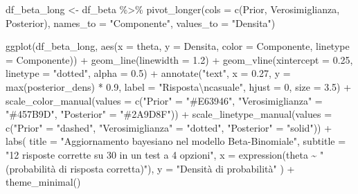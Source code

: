 \documentclass[
  letterpaper,
  DIV=11,
  numbers=noendperiod,
  oneside]{scrreprt}
\newenvironment{Shaded}{\begin{snugshade}}{\end{snugshade}}
\newcommand{\AttributeTok}[1]{\textcolor[rgb]{0.40,0.45,0.13}{#1}}
\newcommand{\DecValTok}[1]{\textcolor[rgb]{0.68,0.00,0.00}{#1}}
\newcommand{\FloatTok}[1]{\textcolor[rgb]{0.68,0.00,0.00}{#1}}
\newcommand{\FunctionTok}[1]{\textcolor[rgb]{0.28,0.35,0.67}{#1}}
\newcommand{\NormalTok}[1]{\textcolor[rgb]{0.00,0.23,0.31}{#1}}
\newcommand{\OtherTok}[1]{\textcolor[rgb]{0.00,0.23,0.31}{#1}}
\newcommand{\SpecialCharTok}[1]{\textcolor[rgb]{0.37,0.37,0.37}{#1}}
\newcommand{\StringTok}[1]{\textcolor[rgb]{0.13,0.47,0.30}{#1}}
\theoremstyle{definition}
\theoremstyle{plain}
\theoremstyle{definition}
\theoremstyle{remark}
\begin{document}
\begin{Shaded}
\begin{Highlighting}[]
\NormalTok{df\_beta\_long }\OtherTok{\textless{}{-}}\NormalTok{ df\_beta }\SpecialCharTok{\%\textgreater{}\%}
  \FunctionTok{pivot\_longer}\NormalTok{(}\AttributeTok{cols =} \FunctionTok{c}\NormalTok{(Prior, Verosimiglianza, Posterior),}
               \AttributeTok{names\_to =} \StringTok{"Componente"}\NormalTok{, }\AttributeTok{values\_to =} \StringTok{"Densita"}\NormalTok{)}

\FunctionTok{ggplot}\NormalTok{(df\_beta\_long, }\FunctionTok{aes}\NormalTok{(}\AttributeTok{x =}\NormalTok{ theta, }\AttributeTok{y =}\NormalTok{ Densita, }\AttributeTok{color =}\NormalTok{ Componente, }\AttributeTok{linetype =}\NormalTok{ Componente)) }\SpecialCharTok{+}
  \FunctionTok{geom\_line}\NormalTok{(}\AttributeTok{linewidth =} \FloatTok{1.2}\NormalTok{) }\SpecialCharTok{+}
  \FunctionTok{geom\_vline}\NormalTok{(}\AttributeTok{xintercept =} \FloatTok{0.25}\NormalTok{, }\AttributeTok{linetype =} \StringTok{"dotted"}\NormalTok{, }\AttributeTok{alpha =} \FloatTok{0.5}\NormalTok{) }\SpecialCharTok{+}
  \FunctionTok{annotate}\NormalTok{(}\StringTok{"text"}\NormalTok{, }\AttributeTok{x =} \FloatTok{0.27}\NormalTok{, }\AttributeTok{y =} \FunctionTok{max}\NormalTok{(posterior\_dens) }\SpecialCharTok{*} \FloatTok{0.9}\NormalTok{, }
           \AttributeTok{label =} \StringTok{"Risposta}\SpecialCharTok{\textbackslash{}n}\StringTok{casuale"}\NormalTok{, }\AttributeTok{hjust =} \DecValTok{0}\NormalTok{, }\AttributeTok{size =} \FloatTok{3.5}\NormalTok{) }\SpecialCharTok{+}
  \FunctionTok{scale\_color\_manual}\NormalTok{(}\AttributeTok{values =} \FunctionTok{c}\NormalTok{(}\StringTok{"Prior"} \OtherTok{=} \StringTok{"\#E63946"}\NormalTok{, }\StringTok{"Verosimiglianza"} \OtherTok{=} \StringTok{"\#457B9D"}\NormalTok{, }\StringTok{"Posterior"} \OtherTok{=} \StringTok{"\#2A9D8F"}\NormalTok{)) }\SpecialCharTok{+}
  \FunctionTok{scale\_linetype\_manual}\NormalTok{(}\AttributeTok{values =} \FunctionTok{c}\NormalTok{(}\StringTok{"Prior"} \OtherTok{=} \StringTok{"dashed"}\NormalTok{, }\StringTok{"Verosimiglianza"} \OtherTok{=} \StringTok{"dotted"}\NormalTok{, }\StringTok{"Posterior"} \OtherTok{=} \StringTok{"solid"}\NormalTok{)) }\SpecialCharTok{+}
  \FunctionTok{labs}\NormalTok{(}
    \AttributeTok{title =} \StringTok{"Aggiornamento bayesiano nel modello Beta{-}Binomiale"}\NormalTok{,}
    \AttributeTok{subtitle =} \StringTok{"12 risposte corrette su 30 in un test a 4 opzioni"}\NormalTok{,}
    \AttributeTok{x =} \FunctionTok{expression}\NormalTok{(theta }\SpecialCharTok{\textasciitilde{}} \StringTok{"(probabilità di risposta corretta)"}\NormalTok{),}
    \AttributeTok{y =} \StringTok{"Densità di probabilità"}
\NormalTok{  ) }\SpecialCharTok{+}
  \FunctionTok{theme\_minimal}\NormalTok{() }
\end{Highlighting}
\end{Shaded}
\end{document}
